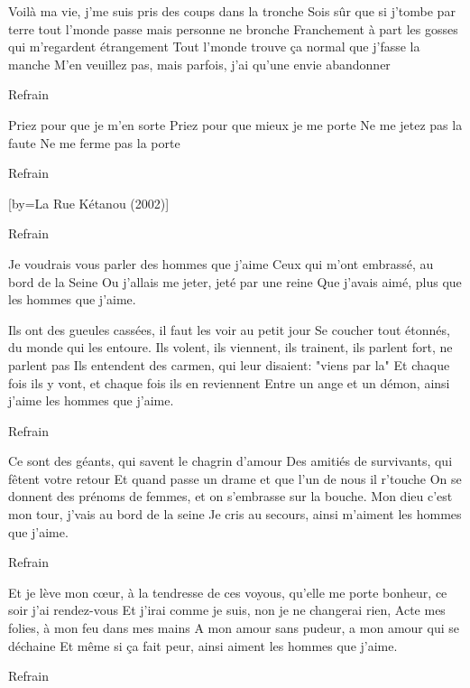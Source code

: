 \beginverse
Voilà ma vie, j'me suis pris des coups dans la tronche
Sois sûr que si j'tombe par terre tout l'monde passe mais personne ne bronche
Franchement à part les gosses qui m'regardent étrangement
Tout l'monde trouve ça normal que j'fasse la manche
M'en veuillez pas, mais parfois, j'ai qu'une envie abandonner
\endverse

\beginverse
Refrain
\endverse

\beginverse
Priez pour que je m'en sorte
Priez pour que mieux je me porte
Ne me jetez pas la faute
Ne me ferme pas la porte
\endverse

\beginverse
Refrain \\[bis]
\endverse

[by={La Rue Kétanou (2002)}]

\beginverse
Refrain
\endverse

\beginverse
Je voudrais vous parler des hommes que j'aime
Ceux qui m'ont embrassé, au bord de la Seine
Ou j'allais me jeter, jeté par une reine
Que j'avais aimé, plus que les hommes que j'aime.
\endverse

\beginverse
Ils ont des gueules cassées, il faut les voir au petit jour
Se coucher tout étonnés, du monde qui les entoure.
Ils volent, ils viennent, ils trainent, ils parlent fort, ne parlent pas
Ils entendent des carmen, qui leur disaient: "viens par la\!"
Et chaque fois ils y vont, et chaque fois ils en reviennent
Entre un ange et un démon, ainsi j'aime les hommes que j'aime.
\endverse

\beginverse
Refrain
\endverse

\beginverse
Ce sont des géants, qui savent le chagrin d'amour
Des amitiés de survivants, qui fêtent votre retour
Et quand passe un drame et que l'un de nous il r'touche
On se donnent des prénoms de femmes, et on s'embrasse sur la bouche.
Mon dieu c'est mon tour, j'vais au bord de la seine
Je cris au secours, ainsi m'aiment les hommes que j'aime.
\endverse

\beginverse
Refrain
\endverse

\beginverse
Et je lève mon cœur, à la tendresse de ces voyous,
qu'elle me porte bonheur, ce soir j'ai rendez-vous
Et j'irai comme je suis, non je ne changerai rien,
Acte mes folies, à mon feu dans mes mains
A mon amour sans pudeur, a mon amour qui se déchaine
Et même si ça fait peur, ainsi aiment les hommes que j'aime.
\endverse

\beginverse
Refrain \\[bis]
\endverse

